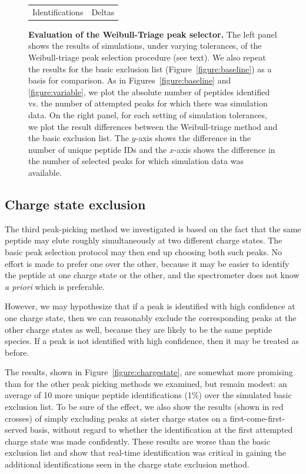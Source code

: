\documentclass[12pt,twoside,openright]{report}
\begin{document}
\begin{figure}
\begin{tabular}{cc}
Identifications & Deltas \\
\end{tabular}
\caption[Evaluation of the Weibull-Triage peak selector]{{\bf Evaluation of the
    Weibull-Triage peak selector.}  The left panel shows the results of
  simulations, under varying tolerances, of the Weibull-triage peak selection
  procedure (see text). We also repeat the results for the basic exclusion list
  (Figure~\ref{figure:baseline}) as a basis for comparison. As in
  Figures~\ref{figure:baseline} and \ref{figure:variable}, we plot the absolute
  number of peptides identified vs. the number of attempted peaks for which
  there was simulation data. On the right panel, for each setting of simulation
  tolerances, we plot the result differences between the Weibull-triage method
  and the basic exclusion list. The $y$-axis shows the difference in the number
  of unique peptide IDs and the $x$-axis shows the difference in the number of
  selected peaks for which simulation data was available.
  \label{figure:triage}}
\end{figure}

\subsection{Charge state exclusion}

The third peak-picking method we investigated is based on the fact that the same
peptide may elute roughly simultaneously at two different charge states. The
basic peak selection protocol may then end up choosing both such peaks. No
effort is made to prefer one over the other, because it may be easier to
identify the peptide at one charge state or the other, and the spectrometer does
not know {\it a priori} which is preferable.

However, we may hypothesize that if a peak is identified with high confidence at
one charge state, then we can reasonably exclude the corresponding peaks at the
other charge states as well, because they are likely to be the same peptide
species. If a peak is not identified with high confidence, then it may be
treated as before.

The results, shown in Figure~\ref{figure:chargestate}, are somewhat more
promising than for the other peak picking methods we examined, but remain
modest: an average of 10 more unique peptide identifications (1\%) over the
simulated basic exclusion list. To be sure of the effect, we also show the
results (shown in red crosses) of simply excluding peaks at sister charge states
on a first-come-first-served basis, without regard to whether the identification
at the first attempted charge state was made confidently. These results are
worse than the basic exclusion list and show that real-time identification was
critical in gaining the additional identifications seen in the charge state
exclusion method.
\end{document}
